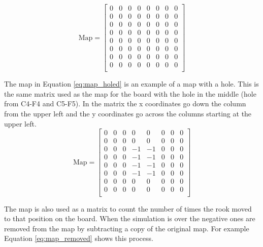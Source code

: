 \documentclass{amsart}
\numberwithin{equation}{section}
\begin{document}
\begin{equation}
    \label{eq:map_open}
    \text{Map}=
  \begin{bmatrix}
    0 & 0 & 0 & 0 & 0 & 0 & 0 & 0 \\
    0 & 0 & 0 & 0 & 0 & 0 & 0 & 0 \\
    0 & 0 & 0 & 0 & 0 & 0 & 0 & 0 \\
    0 & 0 & 0 & 0 & 0 & 0 & 0 & 0 \\
    0 & 0 & 0 & 0 & 0 & 0 & 0 & 0 \\
    0 & 0 & 0 & 0 & 0 & 0 & 0 & 0 \\
    0 & 0 & 0 & 0 & 0 & 0 & 0 & 0 \\
    0 & 0 & 0 & 0 & 0 & 0 & 0 & 0 \\
  \end{bmatrix}
\end{equation}

The map in Equation \ref{eq:map_holed} is an example of a map with a hole. This is the same matrix used as the map for the board with the hole in the middle (hole from C4-F4 and C5-F5). In the matrix the x coordinates go down the column from the upper left and the y coordinates go across the columns starting at the upper left.
\begin{equation}
    \label{eq:map_holed}
    \text{Map}=
      \begin{bmatrix}
        0 & 0 & 0 & 0 & 0 & 0 & 0 & 0 \\
        0 & 0 & 0 & 0 & 0 & 0 & 0 & 0 \\
        0 & 0 & 0 & -1 & -1 & 0 & 0 & 0 \\
        0 & 0 & 0 & -1 & -1 & 0 & 0 & 0 \\
        0 & 0 & 0 & -1 & -1 & 0 & 0 & 0 \\
        0 & 0 & 0 & -1 & -1 & 0 & 0 & 0 \\
        0 & 0 & 0 & 0 & 0 & 0 & 0 & 0 \\
        0 & 0 & 0 & 0 & 0 & 0 & 0 & 0 \\
      \end{bmatrix}
\end{equation}

The map is also used as a matrix to count the number of times the rook moved to that position on the board. When the simulation is over the negative ones are removed from the map by subtracting a copy of the original map. For example Equation \ref{eq:map_removed} shows this process. 
\end{document}
